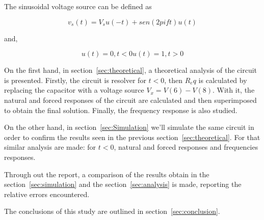 \par The sinusoidal voltage source can be defined as 

\begin{equation}
  v_s(t) = V_su(-t) + sen(2pift)u(t) 
  \label{eq:vs}
\end{equation}

and,

\begin{equation}
  u(t) = 0, t<0 
  u(t) = 1, t>0
  \label{eq:u(t)}
\end{equation}

\par On the first hand, in section~\ref{sec:theoretical}, a theoretical analysis of the circuit is
presented. Firstly, the circuit is resolver for $t<0$, then $R_eq$ is calculated by replacing the capacitor with a voltage source $V_x=V(6)-V(8)$. With it, the natural and forced responses of the circuit are calculated and then superimposed to obtain the final solution. Finally, the frequency response is also studied.

\par On the other hand, in section~\ref{sec:Simulation} we'll simulate the same circuit in order to confirm the results seen in the previous section~\ref{sec:theoretical}. For that similar analysis are made: for $t<0$, natural and forced responses and frequencies responses.

\par Through out the report, a comparison of the results obtain in the section~\ref{sec:simulation} and the section~\ref{sec:analysis} is made, reporting the relative errors encountered. 

\par  The conclusions of this study are outlined in section~\ref{sec:conclusion}.
